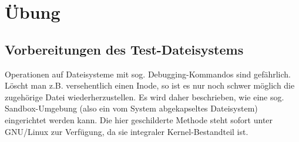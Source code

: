 \documentclass[11pt,a4paper]{article}
\begin{document}
\section{Übung}

\subsection{Vorbereitungen des Test-Dateisystems}

Operationen auf Dateisysteme mit sog. Debugging-Kommandos
sind gefährlich. Löscht man z.B. versehentlich einen Inode, so
ist es nur noch schwer möglich die zugehörige Datei wiederherzustellen. 
Es wird daher beschrieben, wie eine sog.
Sandbox-Umgebung (also ein vom System abgekapseltes Dateisystem)
eingerichtet werden kann. Die hier geschilderte Methode steht
sofort unter GNU/Linux zur Verfügung, da sie integraler Kernel-Bestandteil ist.
\end{document}
